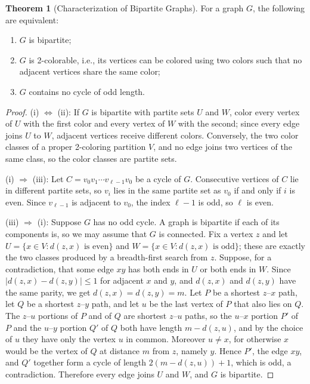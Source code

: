 \documentclass{article}
\theoremstyle{definition}
\newtheorem{theorem}{Theorem}
\begin{document}
\begin{theorem}[Characterization of Bipartite Graphs]
For a graph $G$, the following are equivalent:
\begin{enumerate}[label=(\roman*)]
\item $G$ is bipartite;
\item $G$ is 2-colorable, i.e., its vertices can be colored using two colors such that no adjacent vertices share the same color;
\item $G$ contains no cycle of odd length.
\end{enumerate}
\end{theorem}
\begin{proof}
(i) $\Leftrightarrow$ (ii): If $G$ is bipartite with partite sets $U$ and $W$, color every vertex of $U$ with the first color and every vertex of $W$ with the second; since every edge joins $U$ to $W$, adjacent vertices receive different colors. Conversely, the two color classes of a proper 2-coloring partition $V$, and no edge joins two vertices of the same class, so the color classes are partite sets.

(i) $\Rightarrow$ (iii): Let $C = v_0 v_1 \cdots v_{\ell-1} v_0$ be a cycle of $G$. Consecutive vertices of $C$ lie in different partite sets, so $v_i$ lies in the same partite set as $v_0$ if and only if $i$ is even. Since $v_{\ell-1}$ is adjacent to $v_0$, the index $\ell-1$ is odd, so $\ell$ is even.

(iii) $\Rightarrow$ (i): Suppose $G$ has no odd cycle. A graph is bipartite if each of its components is, so we may assume that $G$ is connected. Fix a vertex $z$ and let $U = \{x \in V : d(z,x) \text{ is even}\}$ and $W = \{x \in V : d(z,x) \text{ is odd}\}$; these are exactly the two classes produced by a breadth-first search from $z$. Suppose, for a contradiction, that some edge $xy$ has both ends in $U$ or both ends in $W$. Since $|d(z,x) - d(z,y)| \leq 1$ for adjacent $x$ and $y$, and $d(z,x)$ and $d(z,y)$ have the same parity, we get $d(z,x) = d(z,y) = m$. Let $P$ be a shortest $z$--$x$ path, let $Q$ be a shortest $z$--$y$ path, and let $u$ be the last vertex of $P$ that also lies on $Q$. The $z$--$u$ portions of $P$ and of $Q$ are shortest $z$--$u$ paths, so the $u$--$x$ portion $P'$ of $P$ and the $u$--$y$ portion $Q'$ of $Q$ both have length $m - d(z,u)$, and by the choice of $u$ they have only the vertex $u$ in common. Moreover $u \neq x$, for otherwise $x$ would be the vertex of $Q$ at distance $m$ from $z$, namely $y$. Hence $P'$, the edge $xy$, and $Q'$ together form a cycle of length $2(m - d(z,u)) + 1$, which is odd, a contradiction. Therefore every edge joins $U$ and $W$, and $G$ is bipartite.
\end{proof}
\end{document}
